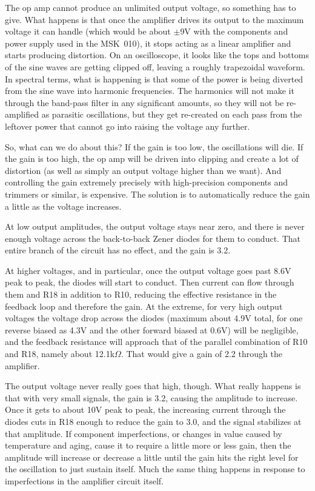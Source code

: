 The op amp cannot produce an unlimited output voltage, so
something has to give.  What happens is that once the amplifier drives its
output to the maximum voltage it can handle (which would be about $\pm$9V
with the components and power supply used in the MSK~010), it stops acting
as a linear amplifier and starts producing distortion.  On an oscilloscope,
it looks like the tops and bottoms of the sine waves are getting clipped
off, leaving a roughly trapezoidal waveform.  In spectral terms, what is
happening is that some of the power is being diverted from the sine wave
into harmonic frequencies.  The harmonics will not make it through the
band-pass filter in any significant amounts, so they will not be re-amplified
as parasitic oscillations, but they get re-created on each pass from the
leftover power that cannot go into raising the voltage any further.

So, what can we do about this?  If the gain is too low, the oscillations
will die.  If the gain is too high, the op amp will be driven into clipping
and create a lot of distortion (as well as simply an output voltage higher
than we want).  And controlling the gain extremely precisely with
high-precision components and trimmers or similar, is expensive.  The
solution is to automatically reduce the gain a little as the voltage
increases.

{\centering\par}

At low output amplitudes, the output voltage stays near zero, and there is
never enough voltage across the back-to-back Zener diodes for them to
conduct.  That entire branch of the circuit has no effect, and the gain is
3.2.

At higher voltages, and in particular, once the output voltage goes past
8.6V peak to peak, the diodes will start to conduct.  Then current can flow
through them and R18 in addition to R10, reducing the effective resistance
in the feedback loop and therefore the gain.  At the extreme, for very high
output voltages the voltage drop across the diodes (maximum about 4.9V total,
for one reverse biased as 4.3V and the other forward biased at 0.6V) will be
negligible, and the feedback resistance will approach that of the parallel
combination of R10 and R18, namely about 12.1k$\Omega$.  That would give a
gain of 2.2 through the amplifier.

The output voltage never really goes that high, though.  What really happens
is that with very small signals, the gain is 3.2, causing the amplitude to
increase.  Once it gets to about 10V peak to peak, the increasing current
through the diodes cuts in R18 enough to reduce the gain to 3.0, and the
signal stabilizes at that amplitude.  If component imperfections, or changes
in value caused by temperature and aging, cause it to require a little more
or less gain, then the amplitude will increase or decrease a little until
the gain hits the right level for the oscillation to just sustain itself. 
Much the same thing happens in response to imperfections in the amplifier
circuit itself.

